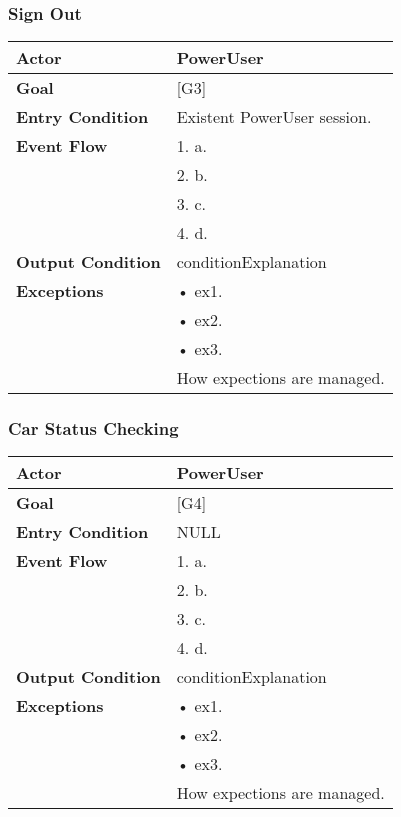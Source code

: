 \subsubsection{Sign Out}
\begin{tabular}{| l | p{8cm} |}
\hline
\textbf{Actor}      &       PowerUser \\
\hline
\textbf{Goal}       &       [G3]\\
\hline
\textbf{Entry Condition} &  Existent PowerUser session.\\
\hline
\textbf{Event Flow}     &   1.	a.\\&
                                            2.	b.\\&
                                            3.	c.\\&
                                            4.  d.\\
\hline
\textbf{Output Condition} & conditionExplanation\\
\hline
\textbf{Exceptions} &       •   ex1.\\& 
                            •	ex2.\\&
                            •	ex3.\\& 
                           How expections are managed.\\
\hline
\end{tabular} 


\subsubsection{Car Status Checking}
\begin{tabular}{| l | p{8cm} |}
\hline
\textbf{Actor}      &       PowerUser \\
\hline
\textbf{Goal}       &       [G4]\\
\hline
\textbf{Entry Condition} &  NULL\\
\hline
\textbf{Event Flow}     &   1.	a.\\&
                                            2.	b.\\&
                                            3.	c.\\&
                                            4.  d.\\
\hline
\textbf{Output Condition} & conditionExplanation\\
\hline
\textbf{Exceptions} &       •   ex1.\\& 
                            •	ex2.\\&
                            •	ex3.\\& 
                           How expections are managed.\\
\hline
\end{tabular} 

